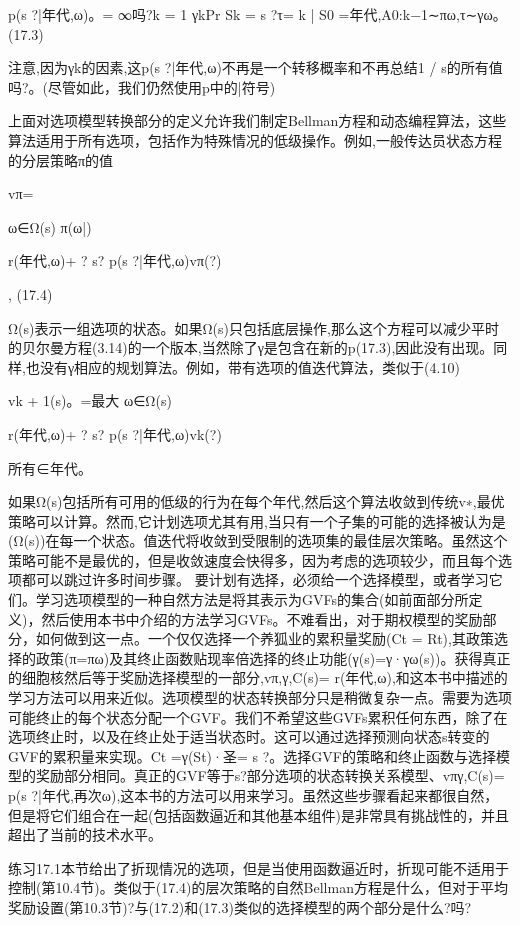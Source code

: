 p(s ?|年代,ω)。=
∞吗?k = 1
γkPr { Sk = s ?τ= k | S0 =年代,A0:k−1∼πω,τ∼γω}。(17.3)

注意,因为γk的因素,这p(s ?|年代,ω)不再是一个转移概率和不再总结1 / s的所有值吗?。(尽管如此，我们仍然使用p中的|符号)

上面对选项模型转换部分的定义允许我们制定Bellman方程和动态编程算法，这些算法适用于所有选项，包括作为特殊情况的低级操作。例如,一般传达员状态方程的分层策略π的值


vπ=

ω∈Ω(s)
π(ω|)

r(年代,ω)+ ?
s?
p(s ?|年代,ω)vπ(?)

, 					(17.4)


Ω(s)表示一组选项的状态。如果Ω(s)只包括底层操作,那么这个方程可以减少平时的贝尔曼方程(3.14)的一个版本,当然除了γ是包含在新的p(17.3),因此没有出现。同样,也没有γ相应的规划算法。例如，带有选项的值迭代算法，类似于(4.10)


vk + 1(s)。=最大
ω∈Ω(s)

r(年代,ω)+ ?
s?
p(s ?|年代,ω)vk(?)

所有∈年代。


如果Ω(s)包括所有可用的低级的行为在每个年代,然后这个算法收敛到传统v∗,最优策略可以计算。然而,它计划选项尤其有用,当只有一个子集的可能的选择被认为是(Ω(s))在每一个状态。值迭代将收敛到受限制的选项集的最佳层次策略。虽然这个策略可能不是最优的，但是收敛速度会快得多，因为考虑的选项较少，而且每个选项都可以跳过许多时间步骤。
要计划有选择，必须给一个选择模型，或者学习它们。学习选项模型的一种自然方法是将其表示为GVFs的集合(如前面部分所定义)，然后使用本书中介绍的方法学习GVFs。不难看出，对于期权模型的奖励部分，如何做到这一点。一个仅仅选择一个养狐业的累积量奖励(Ct = Rt),其政策选择的政策(π=πω)及其终止函数贴现率倍选择的终止功能(γ(s)=γ·γω(s))。获得真正的细胞核然后等于奖励选择模型的一部分,vπ,γ,C(s)= r(年代,ω),和这本书中描述的学习方法可以用来近似。选项模型的状态转换部分只是稍微复杂一点。需要为选项可能终止的每个状态分配一个GVF。我们不希望这些GVFs累积任何东西，除了在选项终止时，以及在终止处于适当状态时。这可以通过选择预测向状态s转变的GVF的累积量来实现。Ct =γ(St)·圣= s ?。选择GVF的策略和终止函数与选择模型的奖励部分相同。真正的GVF等于s?部分选项的状态转换关系模型、vπγ,C(s)= p(s ?|年代,再次ω),这本书的方法可以用来学习。虽然这些步骤看起来都很自然，但是将它们组合在一起(包括函数逼近和其他基本组件)是非常具有挑战性的，并且超出了当前的技术水平。


练习17.1本节给出了折现情况的选项，但是当使用函数逼近时，折现可能不适用于控制(第10.4节)。类似于(17.4)的层次策略的自然Bellman方程是什么，但对于平均奖励设置(第10.3节)?与(17.2)和(17.3)类似的选择模型的两个部分是什么?吗?


